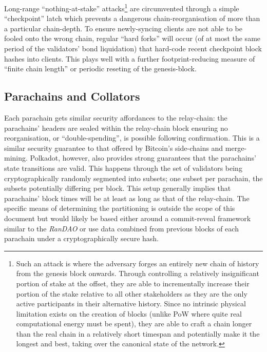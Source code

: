 \documentclass[usepdftitle=false]{beamer}
\begin{document}
\begin{frame}
Long-range ``nothing-at-stake'' attacks\footnote{Such an attack is where the adversary forges an entirely new chain of history from the genesis block onwards. Through controlling a relatively insignificant portion of stake at the offset, they are able to incrementally increase their portion of the stake relative to all other stakeholders as they are the only active participants in their alternative history. Since no intrinsic physical limitation exists on the creation of blocks (unlike PoW where quite real computational energy must be spent), they are able to craft a chain longer than the real chain in a relatively short timespan and potentially make it the longest and best, taking over the canonical state of the network.} are circumvented through a simple ``checkpoint'' latch which prevents a dangerous chain-reorganisation of more than a particular chain-depth. To ensure newly-syncing clients are not able to be fooled onto the wrong chain, regular ``hard forks'' will occur (of at most the same period of the validators' bond liquidation) that hard-code recent checkpoint block hashes into clients. This plays well with a further footprint-reducing measure of ``finite chain length'' or periodic reseting of the genesis-block.

\subsection{Parachains and Collators}\label{parachains-and-collators}

 Each parachain gets similar security affordances to the relay-chain: the parachains' headers are sealed within the relay-chain block ensuring no reorganisation, or ``double-spending'', is possible following confirmation. This is a similar security guarantee to that offered by Bitcoin's side-chains and merge-mining. Polkadot, however, also provides strong guarantees that the parachains' state transitions are valid. This happens through the set of validators being cryptographically randomly segmented into subsets; one subset per parachain, the subsets potentially differing per block. This setup generally implies that parachains' block times will be at least as long as that of the relay-chain. The specific means of determining the partitioning is outside the scope of this document but would likely be based either around a commit-reveal framework similar to the \textit{RanDAO}\cite{randao} or use data combined from previous blocks of each parachain under a cryptographically secure hash.


\end{frame}
\end{document}
